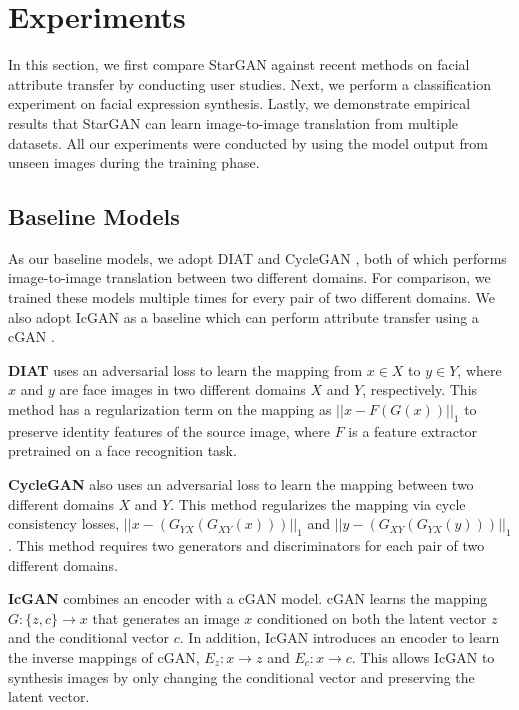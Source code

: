 \documentclass[10pt,twocolumn,letterpaper]{article}
\begin{document}
\section{Experiments} \label{experiments}

In this section, we first compare StarGAN against recent methods on facial attribute transfer by conducting user studies. Next, we perform a classification experiment on facial expression synthesis. Lastly, we demonstrate empirical results that StarGAN can learn image-to-image translation from multiple datasets. All our experiments were conducted by using the model output from unseen images during the training phase. 

\subsection{Baseline Models}
As our baseline models, we adopt DIAT \cite{li2016deep} and CycleGAN \cite{zhu2017unpaired}, both of which performs image-to-image translation between two different domains. For comparison, we trained these models multiple times for every pair of two different domains. We also adopt IcGAN \cite{perarnau2016invertible} as a baseline which can perform attribute transfer using a cGAN \cite{odena2016conditional}. 

\medskip

\noindent \textbf{DIAT} uses an adversarial loss to learn the mapping from $x \in X$ to $y \in Y$, where $x$ and $y$ are face images in two different domains $X$ and $Y$, respectively. This method has a regularization term on the mapping as ${||x - F(G(x))||}_{1} $ to preserve identity features of the source image, where $F$ is a feature extractor pretrained on a face recognition task. 

\medskip

\noindent \textbf{CycleGAN} also uses an adversarial loss to learn the mapping between two different domains $X$ and $Y$. This method regularizes the mapping via cycle consistency losses, ${||x - ({G}_{YX}({G}_{XY}(x)))||}_{1} $ and ${||y - ({G}_{XY}({G}_{YX}(y)))||}_{1}$. This method requires two generators and discriminators for each pair of two different domains.
\medskip

\noindent \textbf{IcGAN} combines an encoder with a cGAN \cite{odena2016conditional} model. cGAN learns the mapping $G: \{z, c\} \rightarrow x$ that generates an image $x$ conditioned on both the latent vector $z$ and the conditional vector $c$. In addition, IcGAN introduces an encoder to learn the inverse mappings of cGAN, ${E}_{z}: x \rightarrow z$ and ${E}_{c}: x \rightarrow c$. This allows IcGAN to synthesis images by only changing the conditional vector and preserving the latent vector.
\end{document}
